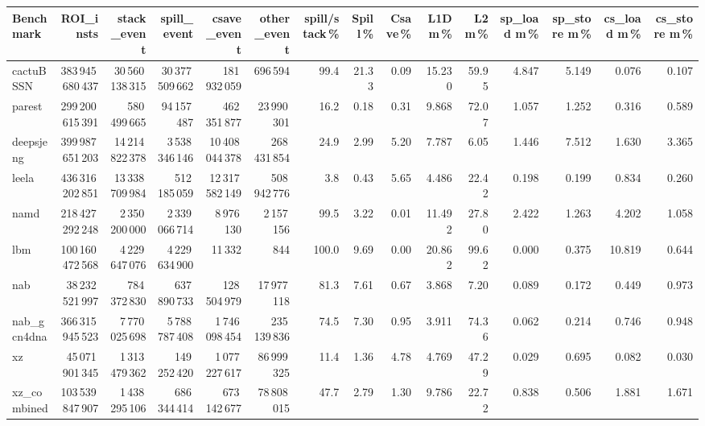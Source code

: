 \documentclass[9pt,landscape,a4paper]{article}
\begin{document}
\vspace{2mm}
\centering
\begin{adjustbox}{max width=\textwidth, max totalheight=0.50\textheight}%
\begin{tabular}{lrrrrrrrrrrrrrr}
\toprule
Benchmark & ROI\_insts & stack\_event & \textbf{spill\_event} & csave\_event & other\_event & spill/stack\,\% & Spill\,\% & Csave\,\% & L1D m\,\% & L2 m\,\% & sp\_load m\,\% & sp\_store m\,\% & cs\_load m\,\% & cs\_store m\,\% \\
\midrule
cactuBSSN & 383\,945\,680\,437 & 30\,560\,138\,315 & 30\,377\,509\,662 & 181\,932\,059 & 696\,594 & 99.4 & 21.33 & 0.09 & 15.230 & 59.95 & 4.847 & 5.149 & 0.076 & 0.107 \\
parest & 299\,200\,615\,391 & 580\,499\,665 & 94\,157\,487 & 462\,351\,877 & 23\,990\,301 & 16.2 & 0.18 & 0.31 & 9.868 & 72.07 & 1.057 & 1.252 & 0.316 & 0.589 \\
deepsjeng & 399\,987\,651\,203 & 14\,214\,822\,378 & 3\,538\,346\,146 & 10\,408\,044\,378 & 268\,431\,854 & 24.9 & 2.99 & 5.20 & 7.787 & 6.05 & 1.446 & 7.512 & 1.630 & 3.365 \\
leela & 436\,316\,202\,851 & 13\,338\,709\,984 & 512\,185\,059 & 12\,317\,582\,149 & 508\,942\,776 & 3.8 & 0.43 & 5.65 & 4.486 & 22.42 & 0.198 & 0.199 & 0.834 & 0.260 \\
namd & 218\,427\,292\,248 & 2\,350\,200\,000 & 2\,339\,066\,714 & 8\,976\,130 & 2\,157\,156 & 99.5 & 3.22 & 0.01 & 11.492 & 27.80 & 2.422 & 1.263 & 4.202 & 1.058 \\
lbm & 100\,160\,472\,568 & 4\,229\,647\,076 & 4\,229\,634\,900 & 11\,332 & 844 & 100.0 & 9.69 & 0.00 & 20.862 & 99.62 & 0.000 & 0.375 & 10.819 & 0.644 \\
nab & 38\,232\,521\,997 & 784\,372\,830 & 637\,890\,733 & 128\,504\,979 & 17\,977\,118 & 81.3 & 7.61 & 0.67 & 3.868 & 7.20 & 0.089 & 0.172 & 0.449 & 0.973 \\
nab\_gcn4dna & 366\,315\,945\,523 & 7\,770\,025\,698 & 5\,788\,787\,408 & 1\,746\,098\,454 & 235\,139\,836 & 74.5 & 7.30 & 0.95 & 3.911 & 74.36 & 0.062 & 0.214 & 0.746 & 0.948 \\
xz & 45\,071\,901\,345 & 1\,313\,479\,362 & 149\,252\,420 & 1\,077\,227\,617 & 86\,999\,325 & 11.4 & 1.36 & 4.78 & 4.769 & 47.29 & 0.029 & 0.695 & 0.082 & 0.030 \\
xz\_combined & 103\,539\,847\,907 & 1\,438\,295\,106 & 686\,344\,414 & 673\,142\,677 & 78\,808\,015 & 47.7 & 2.79 & 1.30 & 9.786 & 22.72 & 0.838 & 0.506 & 1.881 & 1.671 \\

\end{tabular}
\end{adjustbox}
\end{document}

